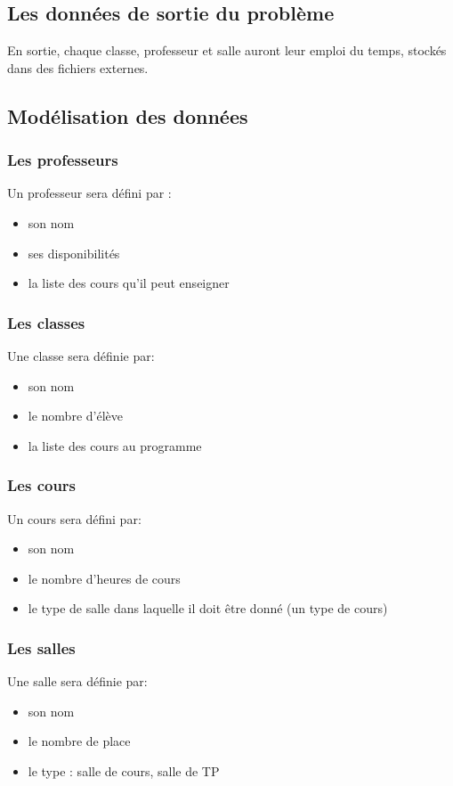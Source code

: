 \documentclass[12pt,a4paper,french]{article}
\begin{document}
\subsection{Les données de sortie du problème}
En sortie, chaque classe, professeur et salle auront leur emploi du temps, stockés dans des fichiers externes.

\subsection{Modélisation des données}
\subsubsection{Les professeurs}
Un professeur sera défini par :
\begin{itemize}
\item son nom
\item ses disponibilités
\item la liste des cours qu'il peut enseigner
\end{itemize}

\subsubsection{Les classes}
Une classe sera définie par:
\begin{itemize}
\item son nom
\item le nombre d'élève
\item la liste des cours au programme
\end{itemize}

\subsubsection{Les cours}
Un cours sera défini par:
\begin{itemize}
\item son nom
\item le nombre d'heures de cours
\item le type de salle dans laquelle il doit être donné (un type de cours)
\end{itemize}

\subsubsection{Les salles}
Une salle sera définie par:
\begin{itemize}
\item son nom
\item le nombre de place
\item le type : salle de cours, salle de TP
\end{itemize}
\end{document}
